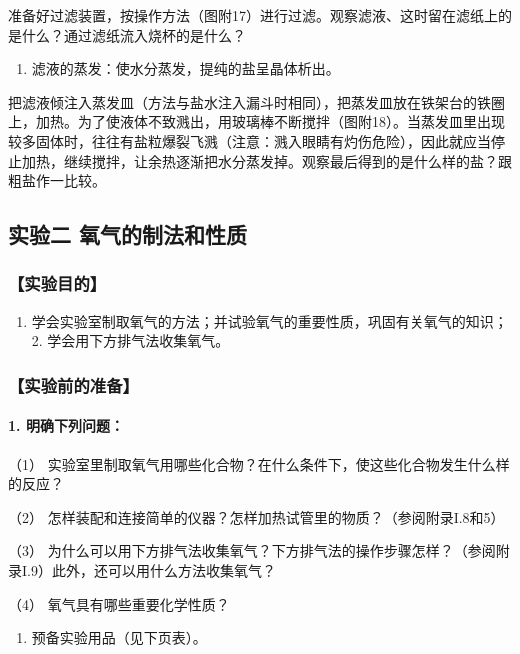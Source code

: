 准备好过滤装置，按操作方法（图附17）进行过滤。观察滤液、这时留在滤纸上的是什么？通过滤纸流入烧杯的是什么？

\begin{enumerate}[start=3]
\item
  滤液的蒸发：使水分蒸发，提纯的盐呈晶体析出。
\end{enumerate}

把滤液倾注入蒸发皿（方法与盐水注入漏斗时相同），把蒸发皿放在铁架台的铁圈上，加热。为了使液体不致溅出，用玻璃棒不断搅拌（图附18）。当蒸发皿里出现较多固体时，往往有盐粒爆裂飞溅（注意：溅入眼睛有灼伤危险），因此就应当停止加热，继续搅拌，让余热逐渐把水分蒸发掉。观察最后得到的是什么样的盐？跟粗盐作一比较。

\subsection{实验二 氧气的制法和性质}

\subsubsection{【实验目的】}

\begin{enumerate}
\item
  学会实验室制取氧气的方法；并试验氧气的重要性质，巩固有关氧气的知识；2.
  学会用下方排气法收集氧气。
\end{enumerate}

\subsubsection{【实验前的准备】}

\paragraph{1. 明确下列问题：}

（1）
实验室里制取氧气用哪些化合物？在什么条件下，使这些化合物发生什么样的反应？

（2） 怎样装配和连接简单的仪器？怎样加热试管里的物质？（参阅附录I.8和5）

（3）
为什么可以用下方排气法收集氧气？下方排气法的操作步骤怎样？（参阅附录I.9）此外，还可以用什么方法收集氧气？

（4） 氧气具有哪些重要化学性质？

\begin{enumerate}[start=2]
\item
  预备实验用品（见下页表）。
\end{enumerate}

